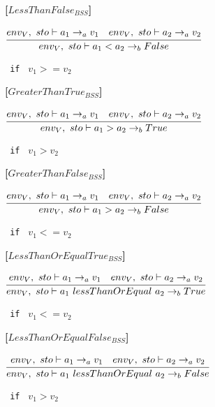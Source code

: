\textbf{[$LessThanFalse_{BSS}$]}\\
\begin{center}
	\begin{math}
	\cfrac
	{env_V,\ sto \vdash a_1 \rightarrow_a v_1 \quad env_V,\ sto \vdash a_2 \rightarrow_a v_2}
	{env_V,\ sto \vdash a_1 < a_2 \rightarrow_b False}
	\end{math}
	
	\texttt{ if } $v_1 >= v_2$
\end{center}

\textbf{[$GreaterThanTrue_{BSS}$]}\\
\begin{center}
	\begin{math}
	\cfrac
	{env_V,\ sto \vdash a_1 \rightarrow_a v_1 \quad env_V,\ sto \vdash a_2 \rightarrow_a v_2}
	{env_V,\ sto \vdash a_1 > a_2 \rightarrow_b True}
	\end{math}
	
	\texttt{ if } $v_1 > v_2$
\end{center}

\textbf{[$GreaterThanFalse_{BSS}$]}\\
\begin{center}
	\begin{math}
	\cfrac
	{env_V,\ sto \vdash a_1 \rightarrow_a v_1 \quad env_V,\ sto \vdash a_2 \rightarrow_a v_2}
	{env_V,\ sto \vdash a_1 > a_2 \rightarrow_b False}
	\end{math}
	
	\texttt{ if } $v_1 <= v_2$
\end{center}

\textbf{[$LessThanOrEqualTrue_{BSS}$]}\\
\begin{center}
	\begin{math}
	\cfrac
	{env_V,\ sto \vdash a_1 \rightarrow_a v_1 \quad env_V,\ sto \vdash a_2 \rightarrow_a v_2}
	{env_V,\ sto \vdash a_1\ lessThanOrEqual\ a_2 \rightarrow_b True}
	\end{math}
	
	\texttt{ if } $v_1 <= v_2$
\end{center}

\textbf{[$LessThanOrEqualFalse_{BSS}$]}\\
\begin{center}
	\begin{math}
	\cfrac
	{env_V,\ sto \vdash a_1 \rightarrow_a v_1 \quad env_V,\ sto \vdash a_2 \rightarrow_a v_2}
	{env_V,\ sto \vdash a_1\ lessThanOrEqual\ a_2 \rightarrow_b False}
	\end{math}
	
	\texttt{ if } $v_1 > v_2$
\end{center}


